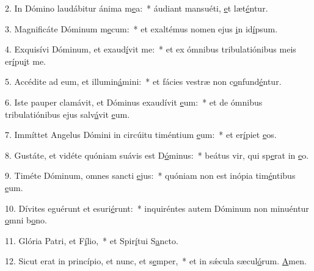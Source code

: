 2. In Dómino laudábitur ánima m\uline{e}a:~* áudiant mansuéti, \uline{e}t læt\uline{é}ntur.\par 
3. Magnificáte Dóminum m\uline{e}cum:~* et exaltémus nomen ejus \uline{i}n id\uline{í}psum.\par 
4. Exquisívi Dóminum, et exaud\uline{í}vit me:~* et ex ómnibus tribulatiónibus meis er\uline{í}pu\uline{i}t me.\par 
5. Accédite ad eum, et illumin\uline{á}mini:~* et fácies vestræ non c\uline{o}nfund\uline{é}ntur.\par 
6. Iste pauper clamávit, et Dóminus exaudívit \uline{e}um:~* et de ómnibus tribulatiónibus ejus salv\uline{á}vit \uline{e}um.\par 
7. Immíttet Angelus Dómini in circúitu timéntium \uline{e}um:~* et er\uline{í}piet \uline{e}os.\par 
8. Gustáte, et vidéte quóniam suávis est D\uline{ó}minus:~* beátus vir, qui sp\uline{e}rat in \uline{e}o.\par 
9. Timéte Dóminum, omnes sancti \uline{e}jus:~* quóniam non est inópia tim\uline{é}ntibus \uline{e}um.\par 
10. Dívites eguérunt et esuri\uline{é}runt:~* inquiréntes autem Dóminum non minuéntur \uline{o}mni b\uline{o}no.\par 
11. Glória Patri, et F\uline{í}lio,~* et Spir\uline{í}tui S\uline{a}ncto.\par 
12. Sicut erat in princípio, et nunc, et s\uline{e}mper,~* et in sǽcula sæcul\uline{ó}rum. \uline{A}men.\par 
